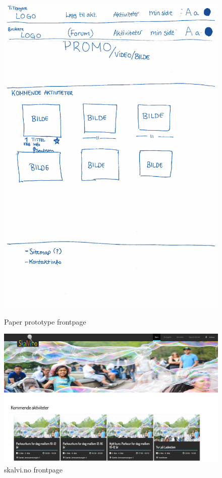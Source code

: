 \begin{figure}[H] 
\centering
\begin{minipage}{.2\textwidth}
\includegraphics[scale=0.2]{fig/PaperPrototype/Front_page.pdf}
\caption{Paper prototype frontpage}
\label{fig:paper_front}
\end{minipage}%
\begin{minipage}{.6\textwidth}
\includegraphics[scale=0.2]{fig/PaperPrototype/forside_skalvi.PNG}
\caption{skalvi.no frontpage}
\label{fig:skalvi_front}
\end{minipage}
\end{figure}

